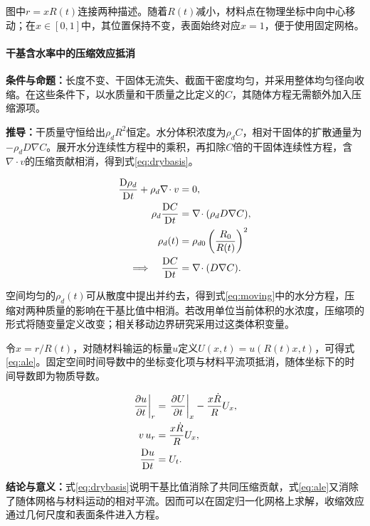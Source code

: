 图中$r=xR(t)$连接两种描述。随着$R(t)$减小，材料点在物理坐标中向中心移动；在$x\in[0,1]$中，其位置保持不变，表面始终对应$x=1$，便于使用固定网格。

\paragraph{干基含水率中的压缩效应抵消}
\textbf{条件与命题：}长度不变、干固体无流失、截面干密度均匀，并采用整体均匀径向收缩。在这些条件下，以水质量和干质量之比定义的$C$，其随体方程无需额外加入压缩源项。

\textbf{推导：}干质量守恒给出$\rho_dR^2$恒定。水分体积浓度为$\rho_dC$，相对干固体的扩散通量为$-\rho_dD\nabla C$。展开水分连续性方程中的乘积，再扣除$C$倍的干固体连续性方程，含$\nabla\cdot v$的压缩贡献相消，得到式\eqref{eq:drybasis}。

\begin{equation}\label{eq:drybasis}
\begin{aligned}
\frac{{\rm D}\rho_d}{{\rm D}t}+\rho_d\nabla\!\cdot v&=0,\\
\rho_d\frac{{\rm D}C}{{\rm D}t}
&=\nabla\!\cdot(\rho_dD\nabla C),\\
\rho_d(t)&=\rho_{d0}\left(\frac{R_0}{R(t)}\right)^2\\
\Longrightarrow\quad\frac{{\rm D}C}{{\rm D}t}&=\nabla\!\cdot(D\nabla C).
\end{aligned}
\end{equation}

空间均匀的$\rho_d(t)$可从散度中提出并约去，得到式\eqref{eq:moving}中的水分方程，压缩对两种质量的影响在干基比值中相消。若改用单位当前体积的水浓度，压缩项的形式将随变量定义改变；相关移动边界研究采用过这类体积变量\cite{adrover2020pears}。

令$x=r/R(t)$，对随材料输运的标量$u$定义$U(x,t)=u(R(t)x,t)$，可得式\eqref{eq:ale}。固定空间时间导数中的坐标变化项与材料平流项抵消，随体坐标下的时间导数即为物质导数。

\begin{equation}\label{eq:ale}
\begin{aligned}
\left.\frac{\partial u}{\partial t}\right|_r
&=\left.\frac{\partial U}{\partial t}\right|_x
-\frac{x\dot R}{R}U_x,\\
v\,u_r&=\frac{x\dot R}{R}U_x,\\
\frac{{\rm D}u}{{\rm D}t}&=U_t.
\end{aligned}
\end{equation}

\textbf{结论与意义：}式\eqref{eq:drybasis}说明干基比值消除了共同压缩贡献，式\eqref{eq:ale}又消除了随体网格与材料运动的相对平流。因而可以在固定归一化网格上求解，收缩效应通过几何尺度和表面条件进入方程。

